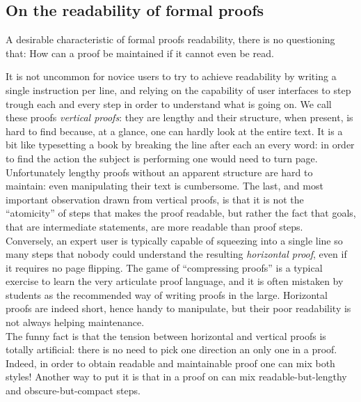 \subsection{On the readability of formal proofs}

A desirable characteristic of formal proofs  readability,
there is no questioning that: How can a proof be maintained if
it cannot even be read.

It is not uncommon for novice users to try to achieve readability by
writing a single instruction per line, and relying on the capability
of user interfaces to step trough each and every step in order to
understand what is going on. We call these proofs \emph{vertical proofs}:
they are lengthy
and their structure, when present, is hard to find
because, at a glance, one can hardly look at the entire text.
It is a bit like
typesetting a book by breaking the line after each an every word: in
order to find the action the subject is performing one would need to
turn page.  
Unfortunately lengthy proofs without an apparent structure are hard to
maintain: even manipulating their text is cumbersome. The last, and
most important observation drawn from vertical proofs, is that it is
not the ``atomicity'' of steps that makes the proof readable, but
rather the fact that goals, that are intermediate statements, are
more readable than proof steps. \\
Conversely, an expert \mcbSSR{} user is typically capable of squeezing
into a single line so many steps that nobody could understand the
resulting \emph{horizontal proof}, even if it requires no page flipping.
The game of ``compressing proofs''
is a typical exercise to learn the very articulate \mcbSSR{} proof
language, and it is often
mistaken by students as the recommended way of writing proofs in the
large. Horizontal proofs are indeed short, hence handy to
manipulate, but their poor readability is not always helping maintenance.\\
The funny fact is that the tension between horizontal and vertical
proofs is totally artificial: there is no need to pick one direction an only
one in a proof. Indeed, in order to obtain readable and maintainable proof
one can mix both styles! Another way to put it is that in a proof on
can mix readable-but-lengthy and obscure-but-compact steps.

